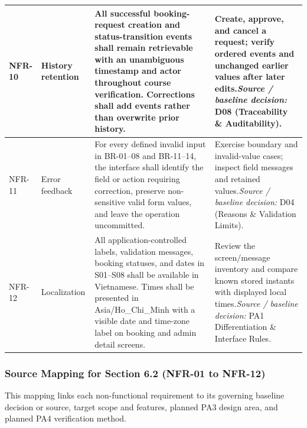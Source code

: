 \begin{longtable}{|>{\raggedright\arraybackslash}p{}|>{\raggedright\arraybackslash}p{}|>{\raggedright\arraybackslash}p{}|>{\raggedright\arraybackslash}p{}|}
NFR-10 & History retention & All successful booking-request creation and status-transition events shall remain retrievable with an unambiguous timestamp and actor throughout course verification. Corrections shall add events rather than overwrite prior history. & Create, approve, and cancel a request; verify ordered events and unchanged earlier values after later edits.\newline\textit{Source / baseline decision:} D08 (Traceability \& Auditability). \\ \hline
NFR-11 & Error feedback & For every defined invalid input in BR-01--08 and BR-11--14, the interface shall identify the field or action requiring correction, preserve non-sensitive valid form values, and leave the operation uncommitted. & Exercise boundary and invalid-value cases; inspect field messages and retained values.\newline\textit{Source / baseline decision:} D04 (Reasons \& Validation Limits). \\ \hline
NFR-12 & Localization & All application-controlled labels, validation messages, booking statuses, and dates in S01--S08 shall be available in Vietnamese. Times shall be presented in Asia/Ho\_Chi\_Minh with a visible date and time-zone label on booking and admin detail screens. & Review the screen/message inventory and compare known stored instants with displayed local times.\newline\textit{Source / baseline decision:} PA1 Differentiation \& Interface Rules. \\ \hline
\end{longtable}
\endgroup

\subsubsection{Source Mapping for Section 6.2 (NFR-01 to NFR-12)}
This mapping links each non-functional requirement to its governing baseline decision or source, target scope and features, planned PA3 design area, and planned PA4 verification method.

